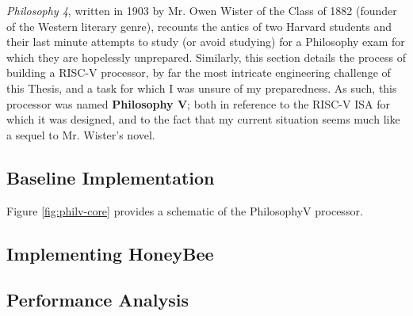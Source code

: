 \textit{Philosophy 4}, written in 1903 by Mr. Owen Wister of the Class of 1882 (founder of the Western literary genre), recounts the antics of two Harvard students and their last minute attempts to study (or avoid studying) for a Philosophy exam for which they are hopelessly unprepared. Similarly, this section details the process of building a RISC-V processor, by far the most intricate engineering challenge of this Thesis, and a task for which I was unsure of my preparedness. As such, this processor was named \textbf{Philosophy V}; both in reference to the RISC-V ISA for which it was designed, and to the fact that my current situation seems much like a sequel to Mr. Wister's novel.
    

    \subsection{Baseline Implementation}
        Figure \ref{fig:philv-core} provides a schematic of the PhilosophyV processor.
        \newpage
         
        \thispagestyle{empty}
        \newpage

    \subsection{Implementing HoneyBee}

    \subsection{Performance Analysis}
